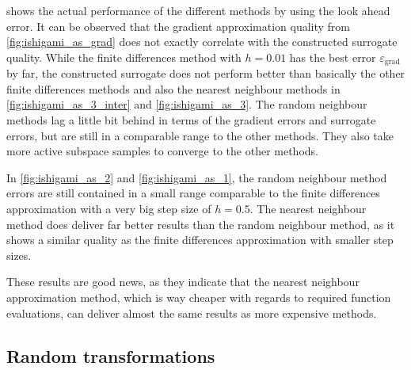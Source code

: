 \documentclass[
  a4paper,  %
  twoside,  %
  bibliography=totoc,
  headsepline,
  cleardoublepage=empty,
  parskip=half,
  draft=false
]{scrbook}
\begin{document}
%
 shows the actual performance of the different methods by using the look ahead error.
It can be observed that the gradient approximation quality from \cref{fig:ishigami_as_grad} does not exactly correlate with the constructed surrogate quality.
While the finite differences method with $h=0.01$ has the best error $\varepsilon_{\mathrm{grad}}$ by far, the constructed surrogate does not perform better than basically the other finite differences methods and also the nearest neighbour methods in \cref{fig:ishigami_as_3_inter} and \cref{fig:ishigami_as_3}.
The random neighbour methods lag a little bit behind in terms of the gradient errors and surrogate errors, but are still in a comparable range to the other methods.
They also take more active subspace samples to converge to the other methods.

In \cref{fig:ishigami_as_2} and \cref{fig:ishigami_as_1}, the random neighbour method errors are still contained in a small range comparable to the finite differences approximation with a very big step size of $h=0.5$.
The nearest neighbour method does deliver far better results than the random neighbour method, as it shows a similar quality as the finite differences approximation with smaller step sizes.

These results are good news, as they indicate that the nearest neighbour approximation method, which is way cheaper with regards to required function evaluations, can deliver almost the same results as more expensive methods.

\subsection{Random transformations}
\end{document}
